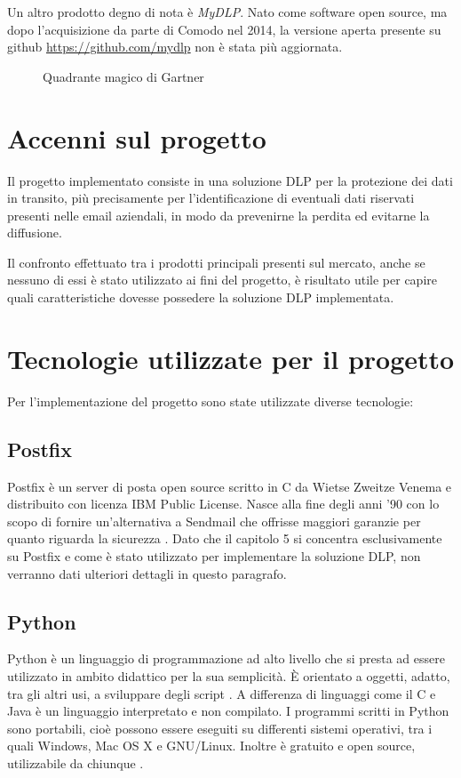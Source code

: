     Un altro prodotto degno di nota è \textit{MyDLP}. Nato come software open source,
    ma dopo l'acquisizione da parte di Comodo nel 2014, la versione aperta presente su github
    \url{https://github.com/mydlp} non è stata più aggiornata.

    \begin{figure}
        \centering
        \caption{Quadrante magico di Gartner}\label{Gartner}
      \end{figure}

\section{Accenni sul progetto}
Il progetto implementato consiste in una soluzione DLP per la protezione dei dati in transito, più precisamente per
l'identificazione di eventuali dati riservati presenti nelle email aziendali, in modo da prevenirne la perdita
ed evitarne la diffusione.

Il confronto effettuato tra i prodotti principali presenti sul mercato, anche se nessuno di essi è stato utilizzato 
ai fini del progetto, è risultato utile per capire quali caratteristiche dovesse possedere la soluzione DLP implementata.

\section{Tecnologie utilizzate per il progetto}
Per l'implementazione del progetto sono state utilizzate diverse tecnologie:
    \subsection{Postfix}
    Postfix è un server di posta open source scritto in C da Wietse Zweitze Venema e distribuito con licenza IBM 
    Public License. Nasce alla fine degli anni '90 con lo scopo di fornire un'alternativa a Sendmail che offrisse 
    maggiori garanzie per quanto riguarda la sicurezza \cite{Postfix1}.
    Dato che il capitolo 5 si concentra esclusivamente su Postfix e come è stato utilizzato per implementare la 
    soluzione DLP, non verranno dati ulteriori dettagli in questo paragrafo.
    
    \subsection{Python}
    Python è un linguaggio di programmazione ad alto livello che si presta ad essere utilizzato in ambito didattico per la sua semplicità. È orientato a oggetti, adatto, tra gli altri usi, a sviluppare 
    degli script \cite{Python1}. A differenza di linguaggi come il C e Java è un linguaggio interpretato e non compilato. 
    I programmi scritti in Python sono portabili, 
    cioè possono essere eseguiti su differenti sistemi operativi, tra i quali Windows, Mac OS X e GNU/Linux. 
    Inoltre è gratuito e open source, utilizzabile da chiunque \cite{boscaini2017imparare}.

